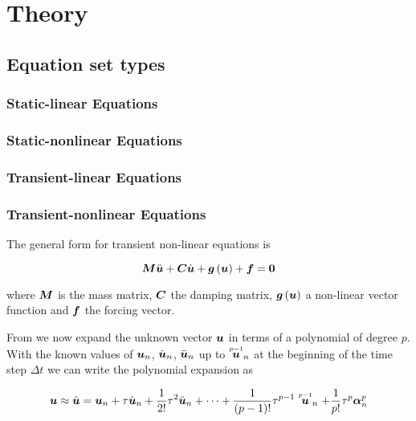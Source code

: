 \clearemptydoublepage
\chapter{Theory}
\label{cha:theory}

\section{Equation set types}

\subsection{Static-linear Equations}

\subsection{Static-nonlinear Equations}

\subsection{Transient-linear Equations}

\subsection{Transient-nonlinear Equations}

The general form for transient non-linear equations is

\begin{equation}
  \matr{M}\ddot{\vect{u}}+\matr{C}\dot{\vect{u}}+\fnof{\vect{g}}{\vect{u}}+\vect{f}=\vect{0}
  \label{eqn:generaltransientnonlinear}
\end{equation}

where $\matr{M}$ is the mass matrix, $\matr{C}$ the damping matrix,
$\fnof{\vect{g}}{\vect{u}}$ a non-linear vector function and $\vect{f}$ the
forcing vector.

From \cite{zienkiewicz:2006_1} we now expand the unknown vector $\vect{u}$ in terms of a polynomial of degree
$p$. With the known values of $\vect{u}_{n}$, $\dot{\vect{u}}_{n}$,
$\ddot{\vect{u}}_{n}$ up to $\symover{p-1}{\vect{u}}_{n}$ at the beginning of
the time step $\Delta t$ we can write the polynomial expansion as

\begin{equation}
  \vect{u}\approx\hat{\vect{u}}=\vect{u}_{n}+\tau\dot{\vect{u}}_{n}+\frac{1}{2!}\tau^{2}\ddot{\vect{u}}_{n}+\cdots+
  \dfrac{1}{\factorial{p-1}}\tau^{p-1}\symover{p-1}{\vect{u}}_{n}+\dfrac{1}{p!}\tau^{p}\vect{\alpha}^{p}_{n}
  \label{eqn:timepolyexpansion}
\end{equation}

